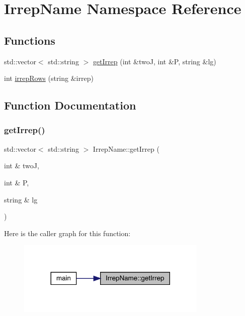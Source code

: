 \hypertarget{namespaceIrrepName}{}\section{Irrep\+Name Namespace Reference}
\label{namespaceIrrepName}
\subsection*{Functions}
\begin{DoxyCompactItemize}
\item 
std\+::vector$<$ std\+::string $>$ \mbox{\hyperlink{namespaceIrrepName_aafd6a227d49ac073e93e6954332007bf}{get\+Irrep}} (int \&twoJ, int \&P, string \&lg)
\item 
int \mbox{\hyperlink{namespaceIrrepName_a3964736788de2a425b5a41ff069f907b}{irrep\+Rows}} (string \&irrep)
\end{DoxyCompactItemize}


\subsection{Function Documentation}
\mbox{\label{namespaceIrrepName_aafd6a227d49ac073e93e6954332007bf}} 
\subsubsection{\texorpdfstring{getIrrep()}{getIrrep()}}
{\footnotesize\ttfamily std\+::vector$<$ std\+::string $>$ Irrep\+Name\+::get\+Irrep (\begin{DoxyParamCaption}\item[{int \&}]{twoJ,  }\item[{int \&}]{P,  }\item[{string \&}]{lg }\end{DoxyParamCaption})}

Here is the caller graph for this function\+:\nopagebreak
\begin{figure}[H]
\begin{center}
\leavevmode
\includegraphics[width=257pt]{d8/dcc/namespaceIrrepName_aafd6a227d49ac073e93e6954332007bf_icgraph}
\end{center}
\end{figure}
\mbox{\label{namespaceIrrepName_a3964736788de2a425b5a41ff069f907b}} 
